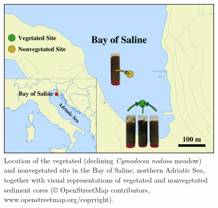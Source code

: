 \documentclass[12pt,]{article}
\begin{document}
\begin{figure}[H]

{\centering \includegraphics[width=1\linewidth]{../results/figures/map} 

}

\caption{Location of the vegetated (declining \textit{Cymodocea nodosa} meadow) and nonvegetated site in the Bay of Saline, northern Adriatic Sea, together with visual representations of vegetated and nonvegetated sediment cores (© OpenStreetMap contributors, www.openstreetmap.org/copyright).\label{map}}\label{fig:unnamed-chunk-1}
\end{figure}
\end{document}

